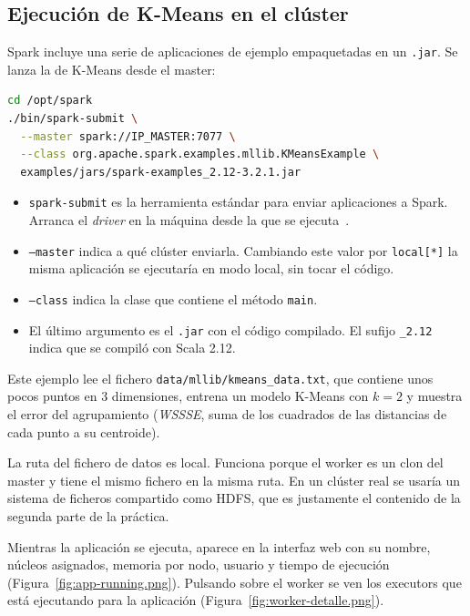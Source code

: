 \documentclass[11pt,a4paper]{article}
\begin{document}
\subsection{Ejecución de K-Means en el clúster}

Spark incluye una serie de aplicaciones de ejemplo empaquetadas en un \texttt{.jar}. Se lanza la de K-Means desde el master:
\begin{lstlisting}[language=bash]
cd /opt/spark
./bin/spark-submit \
  --master spark://IP_MASTER:7077 \
  --class org.apache.spark.examples.mllib.KMeansExample \
  examples/jars/spark-examples_2.12-3.2.1.jar
\end{lstlisting}

\begin{itemize}
  \item \texttt{spark-submit} es la herramienta estándar para enviar aplicaciones a Spark. Arranca el \emph{driver} en la máquina desde la que se ejecuta~\cite{spark-submitting}.
  \item \texttt{--master} indica a qué clúster enviarla. Cambiando este valor por \texttt{local[*]} la misma aplicación se ejecutaría en modo local, sin tocar el código.
  \item \texttt{--class} indica la clase que contiene el método \texttt{main}.
  \item El último argumento es el \texttt{.jar} con el código compilado. El sufijo \texttt{\_2.12} indica que se compiló con Scala 2.12.
\end{itemize}

Este ejemplo lee el fichero \texttt{data/mllib/kmeans\_data.txt}, que contiene unos pocos puntos en 3 dimensiones, entrena un modelo K-Means con $k=2$ y muestra el error del agrupamiento (\emph{WSSSE}, suma de los cuadrados de las distancias de cada punto a su centroide).

\begin{aviso}
La ruta del fichero de datos es local. Funciona porque el worker es un clon del master y tiene el mismo fichero en la misma ruta. En un clúster real se usaría un sistema de ficheros compartido como HDFS, que es justamente el contenido de la segunda parte de la práctica.
\end{aviso}

Mientras la aplicación se ejecuta, aparece en la interfaz web con su nombre, núcleos asignados, memoria por nodo, usuario y tiempo de ejecución (Figura~\ref{fig:app-running.png}). Pulsando sobre el worker se ven los executors que está ejecutando para la aplicación (Figura~\ref{fig:worker-detalle.png}).
\end{document}
